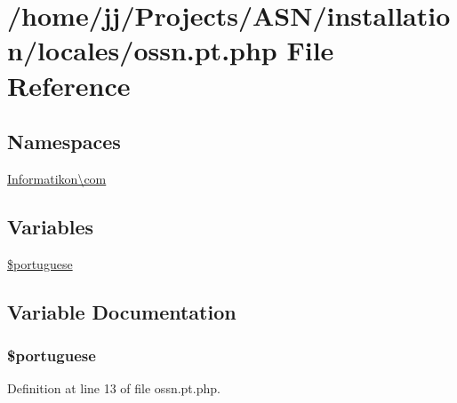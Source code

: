 \hypertarget{installation_2locales_2ossn_8pt_8php}{}\section{/home/jj/\+Projects/\+A\+S\+N/installation/locales/ossn.pt.\+php File Reference}
\label{installation_2locales_2ossn_8pt_8php}
\subsection*{Namespaces}
\begin{DoxyCompactItemize}
\item 
 \hyperlink{namespace_informatikon_1_1com}{Informatikon\textbackslash{}com}
\end{DoxyCompactItemize}
\subsection*{Variables}
\begin{DoxyCompactItemize}
\item 
\hyperlink{installation_2locales_2ossn_8pt_8php_a4010a7f25bdc77c6e4f819621c53623c}{\$portuguese}
\end{DoxyCompactItemize}


\subsection{Variable Documentation}
\subsubsection[{\texorpdfstring{\$portuguese}{$portuguese}}]{\setlength{\rightskip}{0pt plus 5cm}\$portuguese}\hypertarget{installation_2locales_2ossn_8pt_8php_a4010a7f25bdc77c6e4f819621c53623c}{}\label{installation_2locales_2ossn_8pt_8php_a4010a7f25bdc77c6e4f819621c53623c}


Definition at line 13 of file ossn.\+pt.\+php.

